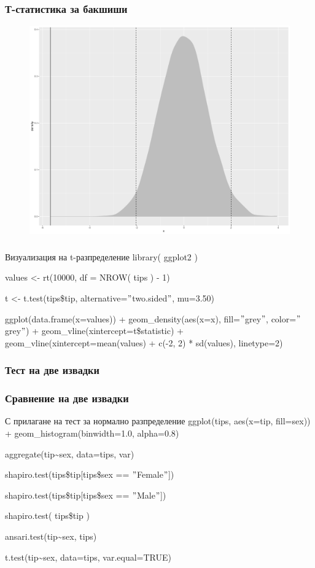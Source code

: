 \documentclass{beamer}
\begin{document}
\begin{frame}
\frametitle{Т-статистика за бакшиши}
\begin{figure}[]\includegraphics[width=\textwidth,height=0.75\textheight]{pic0056}\end{figure}
\end{frame}

\begin{frame}
\frametitle{}
\begin{block}{Визуализация на t-разпределение}
library( ggplot2 )

values <- rt(10000, df = NROW( tips ) - 1)

t <- t.test(tips\$tip, alternative=$"$two.sided$"$, mu=3.50)

ggplot(data.frame(x=values)) + geom\_density(aes(x=x), fill=$"$grey$"$, color=$"$grey$"$) + geom\_vline(xintercept=t\$statistic) + geom\_vline(xintercept=mean(values) + c(-2, 2) * sd(values), linetype=2)
\end{block}
\end{frame}

\subsubsection{Тест на две извадки}

\begin{frame}
\frametitle{Сравнение на две извадки}
\begin{block}{С прилагане на тест за нормално разпределение}
ggplot(tips, aes(x=tip, fill=sex)) + geom\_histogram(binwidth=1.0, alpha=0.8)

aggregate(tip\textasciitilde sex, data=tips, var)

shapiro.test(tips\$tip[tips\$sex == $"$Female$"$])

shapiro.test(tips\$tip[tips\$sex == $"$Male$"$])

shapiro.test( tips\$tip )

ansari.test(tip\textasciitilde sex, tips)

t.test(tip\textasciitilde sex, data=tips, var.equal=TRUE)
\end{block}
\end{frame}
\end{document}
